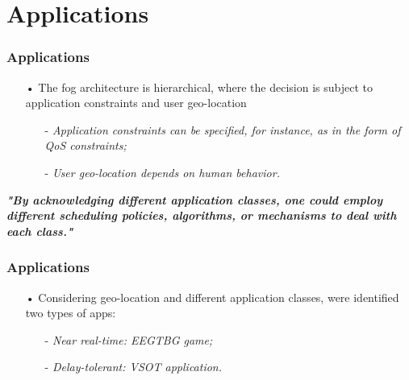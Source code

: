 \documentclass[10pt, pdf, xcolor=pdftex, dvipsnames, table]{beamer}
\begin{document}
\section[Applications]{Applications}

\begin{frame}
	\tableofcontents[currentsection]
\end{frame}

\begin{frame}
	\frametitle{Applications}
 	\begin{block}{}
 		\begin{itemize}
 		    \item[•] The fog architecture is hierarchical, where the decision is subject to application constraints and user geo-location\newline
 				\begin{itemize}
 		    		\item[-] \footnotesize\textit{Application constraints can be specified, for instance, as in the form of QoS constraints;}\newline
 		    		\item[-] \footnotesize\textit{User geo-location depends on human behavior.}
 		    	\end{itemize}
 		\end{itemize}
 	\end{block}
 	\footnotesize\textit{\textbf{"By acknowledging different application classes, one could employ different scheduling policies, algorithms, or mechanisms to deal with each class."}}
\end{frame}

\begin{frame}
	\frametitle{Applications}
 	\begin{block}{}
 		\begin{itemize}
 		    \item[•] Considering geo-location and different application classes, were identified two types of apps:\newline
 				\begin{itemize}
 		    		\item[-] \footnotesize\textit{Near real-time: EEGTBG game;}\newline
 		    		\item[-] \footnotesize\textit{Delay-tolerant: VSOT application.}
 		    	\end{itemize}
 		\end{itemize}
 	\end{block}
\end{frame}
\end{document}
